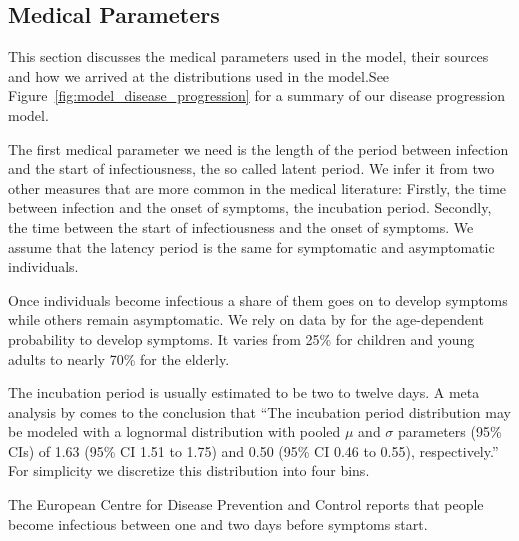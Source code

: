 \subsection{Medical Parameters}
\label{sec:medical_params}

This section discusses the medical parameters used in the model, their sources and how we
arrived at the distributions used in the model.\footnotemark See
Figure~\ref{fig:model_disease_progression} for a summary of our disease progression model.



The first medical parameter we need is the length of the period between infection and the
start of infectiousness, the so called latent period. We infer it from two other measures
that are more common in the medical literature: Firstly, the time between infection and
the onset of symptoms, the incubation period. Secondly, the time between the start of
infectiousness and the onset of symptoms. We assume that the latency period is the same
for symptomatic and asymptomatic individuals.

Once individuals become infectious a share of them goes on to develop symptoms while
others remain asymptomatic. We rely on data by \cite{Davies2020} for the age-dependent
probability to develop symptoms. It varies from 25\% for children and young adults to
nearly 70\% for the elderly.

The incubation period is usually estimated to be two to twelve days. A meta analysis by
\citet{McAloon2020} comes to the conclusion that ``The incubation period distribution may
be modeled with a lognormal distribution with pooled $\mu$ and $\sigma$ parameters (95\%
CIs) of 1.63 (95\% CI 1.51 to 1.75) and 0.50 (95\% CI 0.46 to 0.55), respectively.'' For
simplicity we discretize this distribution into four bins.

The European Centre for Disease Prevention and Control \citep{ECDC2021} reports that
people become infectious between one and two days before symptoms start.\footnotemark


